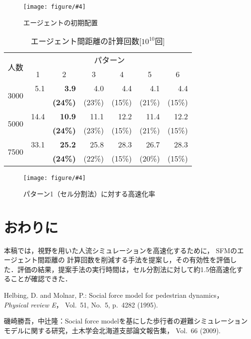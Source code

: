 \documentclass{maelab_y}
\newcommand{\figtb}[5]{ %
\begin{figure}[hbtp]
  \begin{center}
    \texttt{[image: figure/\#4]}
    \caption{#1}
    \label{fig:#5}
  \end{center}
\end{figure}
}%
\newcommand{\分類条件}{%
\begin{table}[t]
\begin{center}
\caption{進行方向を分類する条件}
\ecaption{Classification condition of moving direction $e_{i}$.}
\label{tb:hantei_jouken}
\begin{tabular}{c|c|c|c|c}
\hline \hline
			& 右 & 左 & 上 & 下 \\ \hline
パターン2   & $\frac{1}{\sqrt{2}} < e_x \leq 1  $
		    & $ -1 \leq e_x < \frac{-1}{\sqrt{2}}$ 
		    & $ \frac{-1}{\sqrt{2}} < e_x < \frac{1}{\sqrt{2}} $ 
		    & $ \frac{-1}{2} < e_x < \frac{1}{2} $ \\
パターン3   & $\frac{-1}{2} < e_y < \frac{1}{2} $ 
		    & $\frac{-1}{2} < e_y < \frac{1}{2} $
            & $ \frac{1}{\sqrt{2}} < e_y \leq 1$
		    & $ -1 \leq e_y < \frac{-1}{\sqrt{2}} $ \\
\hline
\multirow{2}{*}{パターン4}   
			& $R_x \geq A_x$ & $R_x < A_x$ & $R_y \geq A_y$ & $R_y < A_y $ \\
	        &  $L_x \geq A_x$ & $L_x < A_x$ & $L_y \geq A_y$ & $L_y < A_y$ \\
\hline
\multirow{2}{*}{パターン5}   
 			& $R_x \geq x_1$ & $R_x < x_2$ & $R_y \geq y_1$ & $R_y < y_2 $ \\
			& $L_x \geq x_1$ & $L_x < x_2$ & $L_y \geq y_1$ & $L_y < y_2 $ \\
\hline
パターン6   & $ \cos(\frac{1}{2}\theta_{view}) \leq  e_y $ 
			& $ e_y \leq -\cos(\frac{1}{2}\theta_{view})$ 
			& $ \sin(\frac{1}{2}(\pi - \theta_{view})) \leq e_x $ 
			& $ e_x \leq \sin(\frac{1}{2}(\pi - \theta_{view}))  $ \\
\hline
\end{tabular}
\end{center}
\end{table}
}%
\newcommand{\距離計算new}{%
  \begin{table}[hbtp]
    \begin{center}
    \caption{エージェント間距離の計算回数[$10^{10}$回]}
    \label{tab:my-table}
    \begin{tabular}{c|llllll}
    \hline \hline
    \multirow{2}{*}{人数}   & \multicolumn{6}{c}{パターン}                                                                                                                                                             \\ \cline{2-7} 
                          & \multicolumn{1}{c|}{1}    & \multicolumn{1}{c|}{2}               & \multicolumn{1}{c|}{3}      & \multicolumn{1}{c|}{4}      & \multicolumn{1}{c|}{5}      & \multicolumn{1}{c}{6}    \\ \hline
    \multirow{2}{*}{3000} & \multicolumn{1}{r|}{5.1}  & \multicolumn{1}{r|}{\textbf{3.9}}    & \multicolumn{1}{r|}{4.0}    & \multicolumn{1}{r|}{4.4}    & \multicolumn{1}{r|}{4.1}    & \multicolumn{1}{r}{4.4}  \\
                          & \multicolumn{1}{l|}{}     & \multicolumn{1}{l|}{\textbf{(24\%)}} & \multicolumn{1}{l|}{(23\%)} & \multicolumn{1}{l|}{(15\%)} & \multicolumn{1}{l|}{(21\%)} & (15\%)                   \\ \hline
    \multirow{2}{*}{5000} & \multicolumn{1}{r|}{14.4} & \multicolumn{1}{r|}{\textbf{10.9}}   & \multicolumn{1}{r|}{11.1}   & \multicolumn{1}{r|}{12.2}   & \multicolumn{1}{r|}{11.4}   & \multicolumn{1}{r}{12.2} \\
                          & \multicolumn{1}{l|}{}     & \multicolumn{1}{l|}{\textbf{(24\%)}} & \multicolumn{1}{l|}{(23\%)} & \multicolumn{1}{l|}{(15\%)} & \multicolumn{1}{l|}{(21\%)} & (15\%)                   \\ \hline
    \multirow{2}{*}{7500} & \multicolumn{1}{r|}{33.1} & \multicolumn{1}{r|}{\textbf{25.2}}   & \multicolumn{1}{r|}{25.8}   & \multicolumn{1}{r|}{28.3}   & \multicolumn{1}{r|}{26.7}   & \multicolumn{1}{r}{28.3} \\
                          & \multicolumn{1}{l|}{}     & \multicolumn{1}{l|}{\textbf{(24\%)}} & \multicolumn{1}{l|}{(22\%)} & \multicolumn{1}{l|}{(15\%)} & \multicolumn{1}{l|}{(20\%)} & (15\%)                   \\ \hline
    \end{tabular}
    \end{center}
    \end{table}
}%
\newcommand{\粒子数}{%
\begin{table}[hbtp]
  \begin{center}
    \caption{各配置の詳細}
    \label{tb:haichi_para}
    \begin{tabular}{c|c|c}
      \hline \hline
      & 教室 & 演習室 \\ \hline 
      エージェント数[人] & 96 & 204 \\ \hline
      壁粒子数[個] & 1037 & 1454\\ \hline
      経由地数[個] & 12   & 26 \\ \hline
      解析領域 & $50m\times50m$ & $50m\times50m$ \\ \hline
    \end{tabular}
  \end{center}
\end{table}
}%
\newcommand{\評価環境}{%
\begin{table}[hbtp]
  \begin{center}
    \caption{各配置の詳細}
    \label{tb:haichi_para}
    \begin{tabular}{c|c|c}
      \hline \hline
                 & マシン1                & マシン2 \\ \hline 
      CPU        & Intel Xeon E5-2687W & Intel Xeon E5-2667W \\ \hline
      メモリ     & 64GB                   & 64GB \\ \hline
      OS         & Linux 4.12.9            & Linux 6.5.8 \\ \hline
      コンパイラ & gcc 7.2.0             & gcc 13.2.0 \\ \hline
    \end{tabular}
  \end{center}
\end{table}
}%
\newcommand{\判定条件new}{%
  \begin{table}[hbtp]
    \centering
		\caption{パターンごとの進行方向分類条件}
		\label{tb:joken}
		{\scriptsize
    \begin{tabular}{Wc{0.5em}|cccWc{8em}}
    \hline \hline
    \multirow{2}{*}{} & \multicolumn{4}{c}{パターン}                                                                             \\ \cline{2-5} 
                          & \multicolumn{1}{c|}{2,3} & \multicolumn{1}{c|}{4}   & \multicolumn{1}{c|}{5}   & 6                   \\ \hline
    \multirow{2}{*}{右}    & \multicolumn{1}{c|}{$\frac{1}{\sqrt{2}} < e_x \leq 1$}  & \multicolumn{1}{c|}{$R_x \geq A_x$}  & \multicolumn{1}{c|}{$R_x \geq x_1$}  & \multirow{2}{*}{$ \cos(\frac{1}{2}\theta_v) \leq  e_y $} \\
                          & \multicolumn{1}{c|}{$\frac{-1}{2} < e_y < \frac{1}{2} $}   & \multicolumn{1}{l|}{$L_x \geq A_x$} & \multicolumn{1}{l|}{$L_x \geq x_1$} &                     \\ \hline
    \multirow{2}{*}{左}    & \multicolumn{1}{c|}{$ -1 \leq e_x < \frac{-1}{\sqrt{2}}$}  & \multicolumn{1}{c|}{$R_x < A_x$}  & \multicolumn{1}{c|}{$R_x < x_2$}  & \multirow{2}{*}{$ e_y \leq -\cos(\frac{1}{2}\theta_{v})$} \\
                          & \multicolumn{1}{l|}{$\frac{-1}{2} < e_y < \frac{1}{2} $}   & \multicolumn{1}{l|}{$L_x < A_x$} & \multicolumn{1}{l|}{$L_x < x_2$ } &                     \\ \hline
    \multirow{2}{*}{上}    & \multicolumn{1}{c|}{$ \frac{-1}{\sqrt{2}} < e_x < \frac{1}{\sqrt{2}}$}  & \multicolumn{1}{c|}{$R_y \geq A_y$ }  & \multicolumn{1}{c|}{$R_y \geq y_1$ }  & \multirow{2}{*}{$ \sin(\frac{1}{2}(\theta_{\pi - v})) \leq e_x$} \\
                          & \multicolumn{1}{l|}{$ \frac{1}{\sqrt{2}} < e_y \leq 1$}   & \multicolumn{1}{l|}{$L_y \geq A_y$} & \multicolumn{1}{l|}{$L_y \geq y_1$} &                     \\ \hline
    \multirow{2}{*}{下}    & \multicolumn{1}{c|}{$ \frac{-1}{2} < e_x < \frac{1}{2} $}  & \multicolumn{1}{c|}{$R_y < A_y $}  & \multicolumn{1}{c|}{$R_y < y_2 $ }  & \multirow{2}{*}{$ e_x \leq \sin(\frac{1}{2}(\theta_{\pi - v}))$} \\
                          & \multicolumn{1}{l|}{$ -1 \leq e_y < \frac{-1}{\sqrt{2}} $}   & \multicolumn{1}{l|}{$L_y < A_y$} & \multicolumn{1}{l|}{$L_y < y_2 $ } &                     \\ \hline
    \end{tabular}
		}
    \end{table}
}%
\begin{document}
\figtb{エージェントの初期配置}{Initial position of agents.}{7}{agent_position.eps}{agent_haichi}


\距離計算new
\figtb{パターン1（セル分割法）に対する高速化率}{}{8}{20230226_kousokuka.eps}{kousokuka2}

\section{おわりに}
本稿では，視野を用いた人流シミュレーションを高速化するために，
SFMのエージェント間距離の
計算回数を削減する手法を提案し，その有効性を評価した．評価の結果，提案手法の実行時間は，セル分割法に対して約1.5倍高速化することが確認できた．

\begin{thebibliography}{9}
\footnotesize
{}
  Helbing, D. and Molnar, P.: Social force model for pedestrian dynamics，{\em
    Physical review E}， Vol.~51, No.~5, p.\ 4282 (1995).

  磯崎勝吾，中辻隆：Social force
  modelを基にした歩行者の避難シミュレーションモデルに関する研究，土木学会北海道支部論文報告集，
  Vol.~66 (2009).
\end{thebibliography}
\end{document}
